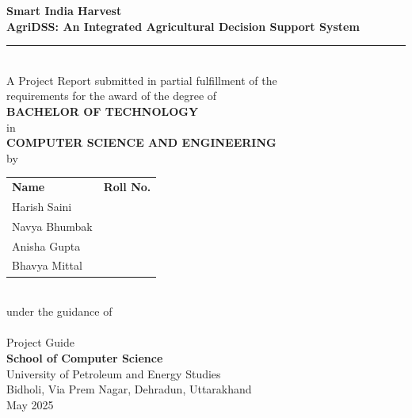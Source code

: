 \documentclass[12pt,a4paper]{report}
\newcommand{\HRule}{\rule{\linewidth}{0.5mm}}
\newcommand{\ProjectName}{Smart India Harvest}
\newcommand{\SystemName}{AgriDSS}
\begin{document}
\begin{titlepage}
\centering
\vspace*{0.5cm}

{\Large \textbf{\ProjectName}}\\[0.25cm]
{\large \textbf{\SystemName: An Integrated Agricultural Decision Support System}}\\[0.35cm]
\HRule\\[0.45cm]

{\normalsize A Project Report submitted in partial fulfillment of the\\
requirements for the award of the degree of}\\[0.55cm]

{\large \textbf{BACHELOR OF TECHNOLOGY}}\\[0.2cm]
{\normalsize in}\\[0.2cm]
{\large \textbf{COMPUTER SCIENCE AND ENGINEERING}}\\[0.75cm]

{\normalsize by}\\[0.45cm]

\begin{tabular}{p{6cm}p{5cm}}
\textbf{Name} & \textbf{Roll No.} \\[4pt]
Harish Saini & \underline{\hspace{3.2cm}} \\
Navya Bhumbak & \underline{\hspace{3.2cm}} \\
Anisha Gupta & \underline{\hspace{3.2cm}} \\
Bhavya Mittal & \underline{\hspace{3.2cm}} \\
\end{tabular}\\[0.75cm]

{\normalsize under the guidance of}\\[0.25cm]
{\large \textbf{\underline{\hspace{6.5cm}}}}\\[0.15cm]
{\normalsize Project Guide}\\[0.8cm]

{\large \textbf{School of Computer Science}}\\[0.1cm]
{\normalsize University of Petroleum and Energy Studies}\\[0.1cm]
{\normalsize Bidholi, Via Prem Nagar, Dehradun, Uttarakhand}\\[0.3cm]
{\normalsize May 2025}

\vfill
\end{titlepage}
\end{document}
